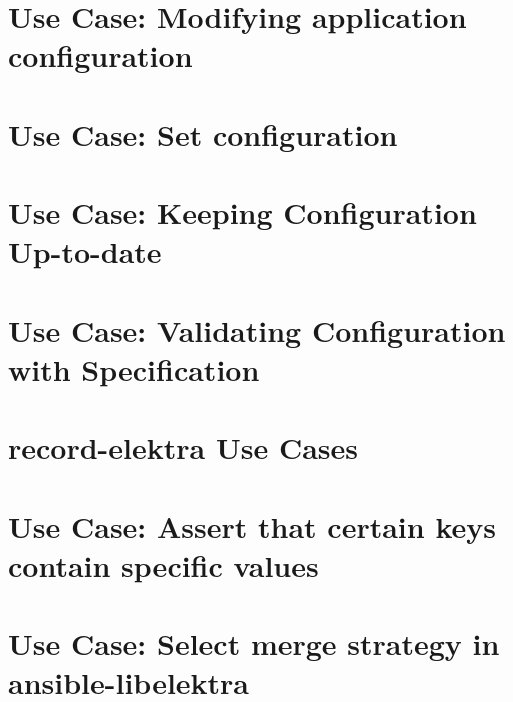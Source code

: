 \let\mypdfximage\pdfximage\def\pdfximage{\immediate\mypdfximage}\documentclass[twoside]{book}
\newcommand{\+}{\discretionary{\mbox{\scriptsize$\hookleftarrow$}}{}{}}
\begin{document}
\chapter{Use Case\+: Modifying application configuration}
\label{doc_usecases_kdb_UC_modify_config_md}

\chapter{Use Case\+: Set configuration}
\label{doc_usecases_kdb_UC_set_config_md}

\chapter{Use Case\+: Keeping Configuration Up-\/to-\/date}
\label{doc_usecases_kdb_UC_uptodate_config_md}

\chapter{Use Case\+: Validating Configuration with Specification}
\label{doc_usecases_kdb_UC_validate_config_md}

\chapter{record-\/elektra Use Cases}
\label{doc_usecases_record_elektra_README_md}

\chapter{Use Case\+: Assert that certain keys contain specific values}
\label{doc_usecases_record_elektra_UC_ansible-libelektra_assert_keys_md}

\chapter{Use Case\+: Select merge strategy in ansible-\/libelektra}
\label{doc_usecases_record_elektra_UC_ansible-libelektra_merge_strategies_md}

\end{document}
